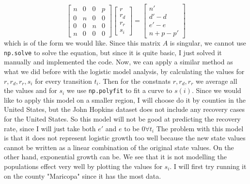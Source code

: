 \documentclass{report}
\begin{document}
                \begin{equation}
                    \begin{bmatrix}
                        n & 0 & 0 & p \\
                        0 & n & 0 & 0 \\
                        0 & 0 & n & 0 \\
                        n & 0 & 0 & 0
                    \end{bmatrix}\begin{bmatrix}
                        r \\
                        r_d \\
                        r_r \\
                        s_i
                    \end{bmatrix} = \begin{bmatrix}
                        n' \\
                        d' - d \\
                        e' - e \\
                        n + p - p'
                    \end{bmatrix}
                \end{equation}
                which is of the form we would like. Since this matrix $A$ is singular, we cannot use \lstinline{np.solve} to solve the equation, but since it is quite basic, I just solved it manually and implemented the code. Now, we can apply a similar method as what we did before with the logistic model analysis, by calculating the values for $r, r_d, r_r, s_i$ for every transition $t_i$. Then for the constnats $r, r_d, r_r$ we average all the values and for $s_i$ we use \lstinline{np.polyfit} to fit a curve to $s(i)$.
                \newline\indent
                Since we would like to apply this model on a smaller region, I will choose do it by counties in the United States, but the John Hopkins dataset does not include any recovery cases for the United States. So this model will not be good at predicting the recovery rate, since I will just take both $e'$ and $e$ to be $0 \forall t_i$
                \newline\indent
                The problem with this model is that it does not represent logistic growth too well because the new state values cannot be written as a linear combination of the original state values. On the other hand, exponential growth can be. We see that it is not modelling the populations effect very well by plotting the values for $s_i$. I will first try running it on the county "Maricopa" since it has the most data.
\end{document}
